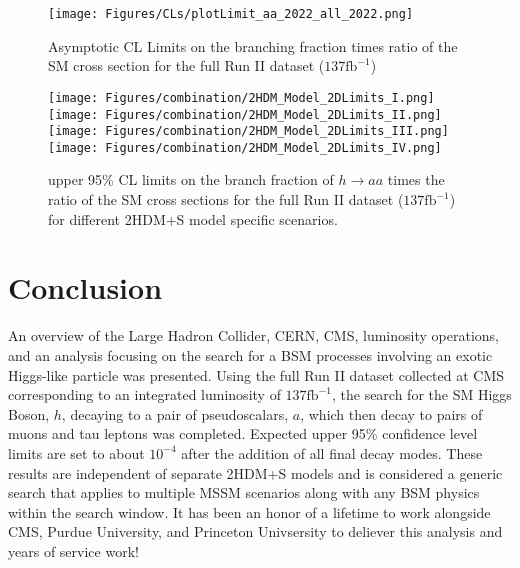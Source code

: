 \begin{figure}[ht!b]
\label{fig:CLsRunII} 
\centering
  \texttt{[image: Figures/CLs/plotLimit\_aa\_2022\_all\_2022.png]}
    \caption{Asymptotic CL Limits on the branching fraction times ratio of the SM cross section for the full Run II dataset ($\text{137}\text{fb}^{-1}$)}
\end{figure}

\begin{figure}[ht!b]
  \centering
  \texttt{[image: Figures/combination/2HDM\_Model\_2DLimits\_I.png]}
  \texttt{[image: Figures/combination/2HDM\_Model\_2DLimits\_II.png]}\\
  \texttt{[image: Figures/combination/2HDM\_Model\_2DLimits\_III.png]}
  \texttt{[image: Figures/combination/2HDM\_Model\_2DLimits\_IV.png]}\\
    \caption{\label{fig:2HDM}  upper 95\% CL limits on the branch fraction of $h\rightarrow a a $ times the ratio of the SM cross sections for the full Run II dataset ($\text{137}\text{fb}^{-1}$) for different 2HDM+S model specific scenarios.}
\end{figure}

\clearpage

\section{Conclusion}
\label{sec:conc}
An overview of the Large Hadron Collider, CERN, CMS, luminosity operations, and an analysis focusing on the search for a BSM processes involving an exotic Higgs-like particle was presented.
Using the full Run II dataset collected at CMS corresponding to an integrated luminosity of $\text{137}\text{fb}^{-1}$, the search for the SM Higgs Boson, $h$, decaying to a pair of pseudoscalars, $a$, which then decay to pairs of muons and tau leptons was completed. 
Expected upper 95\% confidence level limits are set to about $10^{-4}$ after the addition of all final decay modes. 
These results are independent of separate 2HDM+S models and is considered a generic search that applies to multiple MSSM scenarios along with any BSM physics within the search window. 
It has been an honor of a lifetime to work alongside CMS, Purdue University, and Princeton Univsersity to deliever this analysis and years of service work! 
